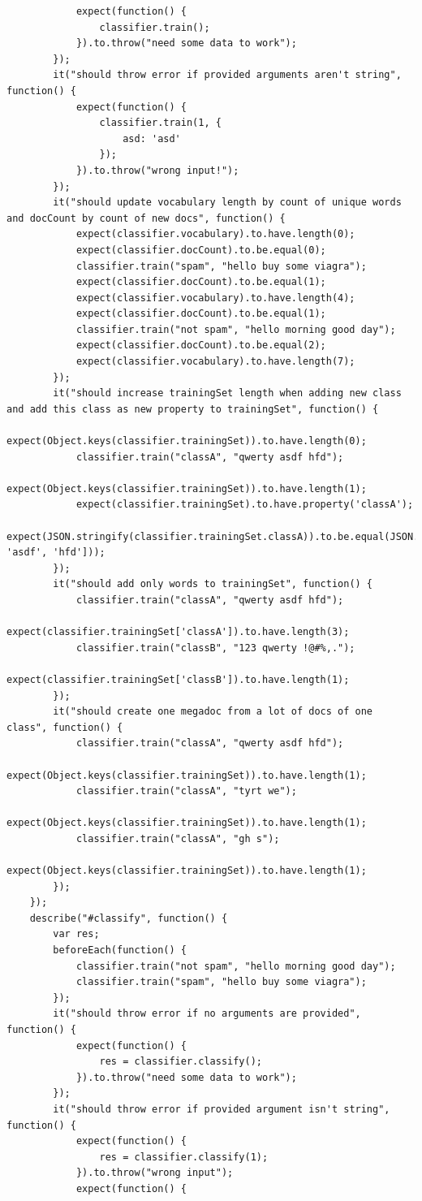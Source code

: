 \documentclass[14pt,a4paper]{extreport}
\begin{document}
\begin{verbatim}
			expect(function() {
				classifier.train();
			}).to.throw("need some data to work");
		});
		it("should throw error if provided arguments aren't string", function() {
			expect(function() {
				classifier.train(1, {
					asd: 'asd'
				});
			}).to.throw("wrong input!");
		});
		it("should update vocabulary length by count of unique words and docCount by count of new docs", function() {
			expect(classifier.vocabulary).to.have.length(0);
			expect(classifier.docCount).to.be.equal(0);
			classifier.train("spam", "hello buy some viagra");
			expect(classifier.docCount).to.be.equal(1);
			expect(classifier.vocabulary).to.have.length(4);
			expect(classifier.docCount).to.be.equal(1);
			classifier.train("not spam", "hello morning good day");
			expect(classifier.docCount).to.be.equal(2);
			expect(classifier.vocabulary).to.have.length(7);
		});
		it("should increase trainingSet length when adding new class and add this class as new property to trainingSet", function() {
			expect(Object.keys(classifier.trainingSet)).to.have.length(0);
			classifier.train("classA", "qwerty asdf hfd");
			expect(Object.keys(classifier.trainingSet)).to.have.length(1);
			expect(classifier.trainingSet).to.have.property('classA');
			expect(JSON.stringify(classifier.trainingSet.classA)).to.be.equal(JSON.stringify(['qwerty', 'asdf', 'hfd']));
		});
		it("should add only words to trainingSet", function() {
			classifier.train("classA", "qwerty asdf hfd");
			expect(classifier.trainingSet['classA']).to.have.length(3);
			classifier.train("classB", "123 qwerty !@#%,.");
			expect(classifier.trainingSet['classB']).to.have.length(1);
		});
		it("should create one megadoc from a lot of docs of one class", function() {
			classifier.train("classA", "qwerty asdf hfd");
			expect(Object.keys(classifier.trainingSet)).to.have.length(1);
			classifier.train("classA", "tyrt we");
			expect(Object.keys(classifier.trainingSet)).to.have.length(1);
			classifier.train("classA", "gh s");
			expect(Object.keys(classifier.trainingSet)).to.have.length(1);
		});
	});
	describe("#classify", function() {
		var res;
		beforeEach(function() {
			classifier.train("not spam", "hello morning good day");
			classifier.train("spam", "hello buy some viagra");
		});
		it("should throw error if no arguments are provided", function() {
			expect(function() {
				res = classifier.classify();
			}).to.throw("need some data to work");
		});
		it("should throw error if provided argument isn't string", function() {
			expect(function() {
				res = classifier.classify(1);
			}).to.throw("wrong input");
			expect(function() {

\end{verbatim}
\end{document}
